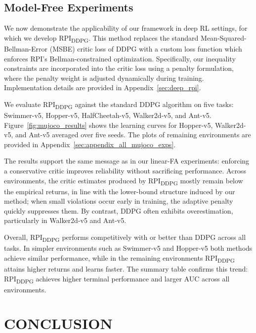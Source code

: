 \documentclass[twoside]{article}
\theoremstyle{plain}
\theoremstyle{definition}
\theoremstyle{remark}
\newcommand{\rpiddpg}{RPI\textsubscript{DDPG}}
\begin{document}
\subsection{Model-Free Experiments}
\label{subsec:model_free_experiments}

We now demonstrate the applicability of our framework in deep RL settings, for which we develop \textsc{RPI\textsubscript{DDPG}}. This method replaces the standard Mean-Squared-Bellman-Error (MSBE) critic loss of DDPG with a custom loss function which enforces RPI's Bellman-constrained optimization.
Specifically, our inequality constraints are incorporated into the critic loss using a penalty formulation, where the penalty weight is adjusted dynamically during training. 
Implementation details are provided in Appendix~\ref{sec:deep_rpi}. 

We evaluate \rpiddpg{} against the standard DDPG algorithm on five tasks: Swimmer-v5, Hopper-v5, HalfCheetah-v5, Walker2d-v5, and Ant-v5. Figure~\ref{fig:mujoco_results} shows the learning curves for Hopper-v5, Walker2d-v5, and Ant-v5 averaged over five seeds. The plots of remaining environments are provided in Appendix~\ref{sec:appendix_all_mujoco_exps}. 

The results support the same message as in our linear-FA experiments: enforcing a conservative critic improves reliability without sacrificing performance. Across environments, the critic estimates produced by \rpiddpg{} mostly remain below the empirical returns, in line with the lower-bound structure induced by our method; when small violations occur early in training, the adaptive penalty quickly suppresses them. By contrast, DDPG often exhibits overestimation, particularly in Walker2d-v5 and Ant-v5.

Overall, \rpiddpg{} performs competitively with or better than DDPG across all tasks. 
In simpler environments such as Swimmer-v5 and Hopper-v5 both methods achieve similar performance, while in the remaining environments \rpiddpg{} attains higher returns and learns faster. 
The summary table confirms this trend: \rpiddpg{} achieves higher terminal performance and larger AUC across all environments.

\section{CONCLUSION}
\end{document}
